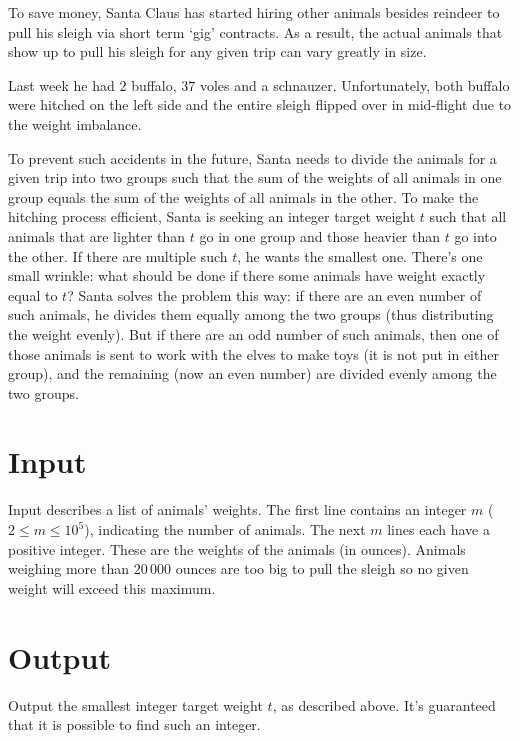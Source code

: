 

To save money, Santa Claus has started hiring other animals besides reindeer to
pull his sleigh via short term `gig' contracts.  As a result, the actual
animals that show up to pull his sleigh for any given trip can vary greatly in
size.

Last week he had $2$ buffalo, $37$ voles and a schnauzer. Unfortunately, both
buffalo were hitched on the left side and the entire sleigh flipped over in
mid-flight due to the weight imbalance.

To prevent such accidents in the future, Santa needs to divide the animals for
a given trip into two groups such that the sum of the weights of all animals in
one group equals the sum of the weights of all animals in the other. To make
the hitching process efficient, Santa is seeking an integer target weight $t$
such that all animals that are lighter than $t$ go in one group and those
heavier than $t$ go into the other. If there are multiple such $t$, he wants
the smallest one. There's one small wrinkle: what should be done if there some
animals have weight exactly equal to $t$? Santa solves the problem this way: if
there are an even number of such animals, he divides them equally among the two
groups (thus distributing the weight evenly). But if there are an odd number of
such animals, then one of those animals is sent to work with the elves to make
toys (it is not put in either group), and the remaining (now an even number)
are divided evenly among the two groups.

\section*{Input}

Input describes a list of animals' weights. The first line contains an integer
$m$ ($2 \le m \le 10^5$), indicating the number of animals. The next $m$ lines
each have a positive integer. These are the weights of the animals (in ounces).
Animals weighing more than $20\,000$ ounces are too big to pull the sleigh so
no given weight will exceed this maximum.

\section*{Output}

Output the smallest integer target weight $t$, as described above. It's
guaranteed that it is possible to find such an integer.

